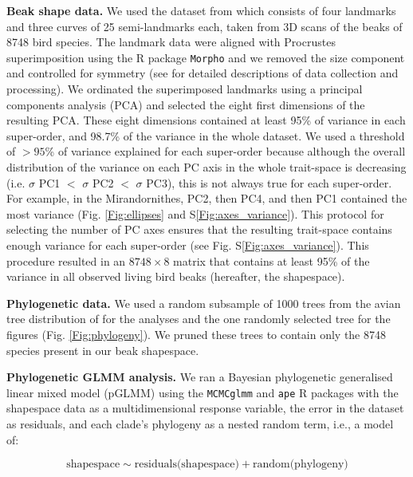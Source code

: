 \documentclass[12pt,letterpaper]{article}
\begin{document}
\textbf{Beak shape data.}
We used the dataset from \cite{cooney2017mega,hughes2022global,chira2020signature} which consists of four landmarks and three curves of 25 semi-landmarks each, taken from 3D scans of  the beaks of 8748 bird species.
The landmark data were aligned with Procrustes superimposition using the R package \texttt{Morpho} \cite{Rcore,Morpho} and we removed the size component and controlled for symmetry (see \cite{cooney2017mega,hughes2022global,chira2020signature} for detailed descriptions of data collection and processing).
We ordinated the superimposed landmarks using a principal components analysis (PCA) and selected the eight first dimensions of the resulting PCA.
These eight dimensions contained at least 95\% of variance in each super-order, and 98.7\% of the variance in the whole dataset.
We used a threshold of $>95$\% of variance explained for each super-order because although the overall distribution of the variance on each PC axis in the whole trait-space is decreasing (i.e.
$\sigma$ PC1 $<$ $\sigma$ PC2 $<$ $\sigma$ PC3), this is not always true for each super-order.
For example, in the Mirandornithes, PC2, then PC4, and then PC1 contained the most variance (Fig. \ref{Fig:ellipses} and S\ref{Fig:axes_variance}).
This protocol for selecting the number of PC axes ensures that the resulting trait-space contains enough variance for each super-order (see Fig. S\ref{Fig:axes_variance}).
This procedure resulted in an $8748 \times 8$ matrix that contains at least 95\% of the variance in all observed living bird beaks (hereafter, the shapespace).

\textbf{Phylogenetic data.}
We used a random subsample of 1000 trees from the avian tree distribution of \cite{jetz2012global} for the analyses and the one randomly selected tree for the figures (Fig. \ref{Fig:phylogeny}).
We pruned these trees to contain only the 8748 species present in our beak shapespace.

\textbf{Phylogenetic GLMM analysis.}
We ran a Bayesian phylogenetic generalised linear mixed model (pGLMM) using the \texttt{MCMCglmm} and \texttt{ape} R packages \cite{MCMCglmm, ape} with the shapespace data as a multidimensional response variable, the error in the dataset as residuals, and each clade's phylogeny as a nested random term, i.e., a model of:

\begin{equation}
\text{shapespace} \mathtt{\sim} \text{residuals(shapespace)} + \text{random(phylogeny)}
\end{equation}
\end{document}
